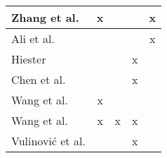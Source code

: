 \begin{table}[!ht]
\begin{tabular}{l|c|c|c|c}
Zhang et al. \cite{zhang_svm_2016}           & x      &        &      & x     \\ \hline
Ali et al. \cite{ali_classification_2018}    &        &        &      & x     \\ \hline
Hiester \cite{hiester_file_2018}             &        &        & x    &       \\ \hline
Chen et al. \cite{chen_file_2018}            &        &        & x    &       \\ \hline
Wang et al. \cite{wang_sparse_2018}          & x      &        &      &       \\ \hline
Wang et al. \cite{wang_file_2018}            & x      & x      & x    &       \\ \hline
Vulinović et al. \cite{vulinovic_neural_2019} &       &        & x    &       \\ \hline

\end{tabular}
\end{table}